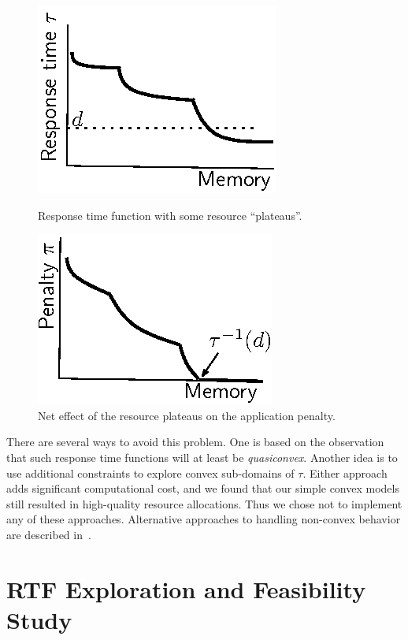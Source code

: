 \begin{figure}[hb]
\parbox{3in}{
\includegraphics*[width=.45\columnwidth]{Figures/Plateau1.eps}
\caption{\label{f:plat}Response time function with some resource ``plateaus''.}
}
\hspace{\fill}
\parbox{3in}{
\includegraphics*[width=.45\columnwidth]{Figures/Plateau2.eps}
\caption{\label{f:plateffect}Net effect of the resource plateaus on the application penalty.}
}
\end{figure}
There are several ways to avoid this problem.  One is based on the observation that such response time functions will at least be \emph{quasiconvex}.  Another idea is to use additional constraints to explore convex sub-domains of $\tau$. Either approach adds significant computational cost, and we found that our simple convex models still resulted in high-quality resource allocations. Thus we chose not to implement any of these approaches.  Alternative approaches to handling non-convex behavior are described in~\cite{pacora_tr}. 

\section{RTF Exploration and Feasibility Study}\label{init_eval}


